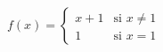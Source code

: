 \setcounter{enumi}{50}
    \item $f(x) = \begin{cases} x + 1 & \text{si } x \ne 1 \\ 1 & \text{si } x = 1 \end{cases}$
